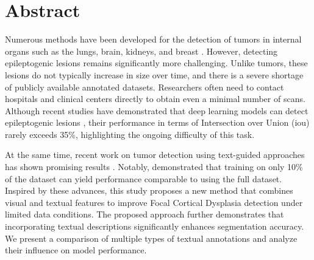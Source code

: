 \documentclass[FCD_GNN.tex]{subfiles}
\begin{document}
\chapter*{Abstract}

Numerous methods have been developed for the detection of tumors in internal organs such as the lungs, brain, kidneys, 
and breast \parencite{Durgam2025LungCancer, Abdusalomov2023BrainTumor, Sharma2025KidneyCT, Mehmood2025BreastCancer}. 
However, detecting epileptogenic lesions remains significantly more challenging. Unlike tumors, these lesions do not typically 
increase in size over time, and there is a severe shortage of publicly available annotated datasets. Researchers often need 
to contact hospitals and clinical centers directly to obtain even a minimal number of scans. Although recent studies have 
demonstrated that deep learning models can detect epileptogenic lesions \parencite{Ripart2025MELD}, their performance in terms of Intersection over 
Union (\acs{iou}) rarely exceeds 35\%, highlighting the ongoing difficulty of this task.

At the same time, recent work on tumor detection using text-guided approaches has shown promising results \parencite{Li2024LGMSeg, Li2025Mulmodseg, Zhang2025OrganAware}. 
Notably, \parencite{Zhong2023Ariadne} demonstrated that training on only 10\% of the dataset can yield performance comparable to using the full dataset. 
Inspired by these advances, this study proposes a new method that combines visual and textual features to improve Focal Cortical Dysplasia detection under limited data conditions. 
The proposed approach further demonstrates that incorporating textual descriptions significantly enhances segmentation accuracy. 
We present a comparison of multiple types of textual annotations and analyze their influence on model performance.

\end{document}
